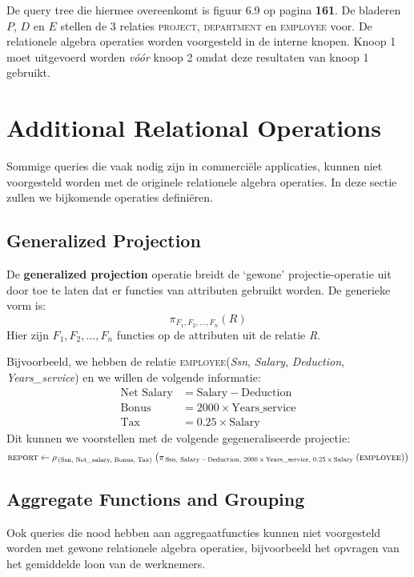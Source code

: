 \noindent De query tree die hiermee overeenkomt is figuur 6.9 op pagina \textbf{161}. De bladeren $P$, $D$ en $E$ stellen de 3 relaties \textsc{project}, \textsc{department} en \textsc{employee} voor. De relationele algebra operaties worden voorgesteld in de interne knopen. Knoop 1 moet uitgevoerd worden \textit{v\'o\'or} knoop 2 omdat deze resultaten van knoop 1 gebruikt.



\section{Additional Relational Operations}
Sommige queries die vaak nodig zijn in commerci\"ele applicaties, kunnen niet voorgesteld worden met de originele relationele algebra operaties. In deze sectie zullen we bijkomende operaties defini\"eren.


\subsection{Generalized Projection}
De \textbf{generalized projection} operatie breidt de `gewone' projectie-operatie uit door toe te laten dat er functies van attributen gebruikt worden. De generieke vorm is:
\vspace{-2mm}
\[ \pi_{F_1,F_2,\dots,F_n}(R) \]
Hier zijn $F_1,F_2,\dots,F_n$ functies op de attributen uit de relatie \textit{R}.

\newpage
\noindent Bijvoorbeeld, we hebben de relatie \textsc{employee}(\textit{Ssn}, \textit{Salary}, \textit{Deduction}, \textit{Years\_service}) en we willen de volgende informatie:
\vspace{-2mm}
\begin{align*}
\text{Net Salary} &= \text{Salary} - \text{Deduction} \\
\text{Bonus} &= 2000 \times \text{Years\_service} \\
\text{Tax} &= 0.25 \times \text{Salary}
\end{align*}
Dit kunnen we voorstellen met de volgende gegeneraliseerde projectie:
\vspace{-2mm}
\[ \textsc{report} \leftarrow \rho_{\,(\text{Ssn, Net\_salary, Bonus, Tax})} \;\big( \pi_{\,\text{Ssn, Salary} \,-\, \text{Deduction, } 2000 \,\times\, \text{Years\_service, } 0.25 \,\times\, \text{Salary}} \;(\textsc{employee})\big) \]


\subsection{Aggregate Functions and Grouping}
Ook queries die nood hebben aan aggregaatfuncties kunnen niet voorgesteld worden met gewone relationele algebra operaties, bijvoorbeeld het opvragen van het gemiddelde loon van de werknemers.

